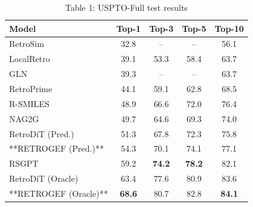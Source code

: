 \begin{table}[t]
\centering
\caption{Table 1: USPTO-Full test results}
\label{tab:2609.38484}
\begin{tabular}{lcccc}
\toprule
Model & Top-1 & Top-3 & Top-5 & Top-10 \\
\midrule
RetroSim & 32.8 & – & – & 56.1 \\
LocalRetro & 39.1 & 53.3 & 58.4 & 63.7 \\
GLN & 39.3 & – & – & 63.7 \\
RetroPrime & 44.1 & 59.1 & 62.8 & 68.5 \\
R-SMILES & 48.9 & 66.6 & 72.0 & 76.4 \\
NAG2G & 49.7 & 64.6 & 69.3 & 74.0 \\
RetroDiT (Pred.) & 51.3 & 67.8 & 72.3 & 75.8 \\
**RETROGEF (Pred.)** & 54.3 & 70.1 & 74.1 & 77.1 \\
RSGPT & 59.2 & \textbf{74.2} & \textbf{78.2} & 82.1 \\
RetroDiT (Oracle) & 63.4 & 77.6 & 80.9 & 83.6 \\
**RETROGEF (Oracle)** & \textbf{68.6} & 80.7 & 82.8 & \textbf{84.1} \\
\bottomrule
\end{tabular}
\end{table}
